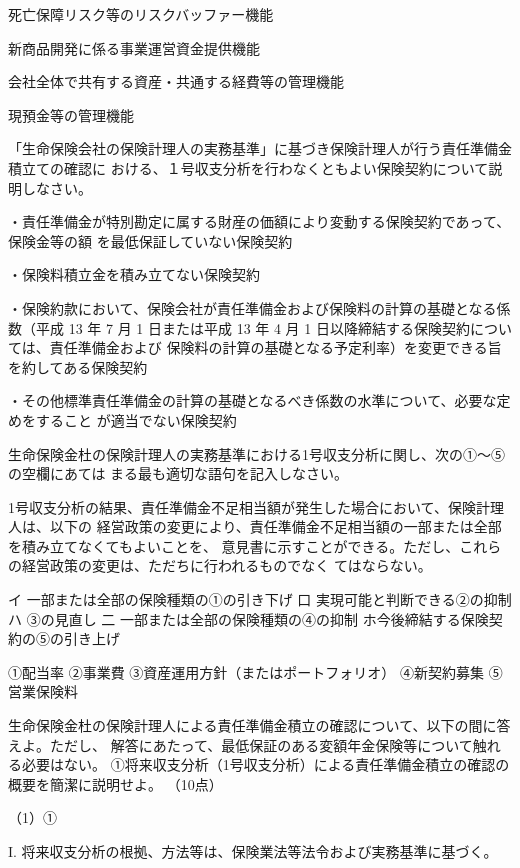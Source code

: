 \documentclass[report,gutter=10mm,fore-edge=10mm,uplatex,dvipdfmx]{jlreq}
\begin{document}
\answer{}
死亡保障リスク等のリスクバッファー機能

新商品開発に係る事業運営資金提供機能

会社全体で共有する資産・共通する経費等の管理機能

現預金等の管理機能

「生命保険会社の保険計理人の実務基準」に基づき保険計理人が行う責任準備金積立ての確認に
おける、１号収支分析を行わなくともよい保険契約について説明しなさい。

\answer{}

・責任準備金が特別勘定に属する財産の価額により変動する保険契約であって、保険金等の額
を最低保証していない保険契約

・保険料積立金を積み立てない保険契約

・保険約款において、保険会社が責任準備金および保険料の計算の基礎となる係数（平成 13
年 7 月 1 日または平成 13 年 4 月 1 日以降締結する保険契約については、責任準備金および
保険料の計算の基礎となる予定利率）を変更できる旨を約してある保険契約

・その他標準責任準備金の計算の基礎となるべき係数の水準について、必要な定めをすること
が適当でない保険契約

生命保険金杜の保険計理人の実務基準における1号収支分析に関し、次の①〜⑤の空欄にあては
まる最も適切な語句を記入しなさい。

1号収支分析の結果、責任準備金不足相当額が発生した場合において、保険計理人は、以下の
経営政策の変更により、責任準備金不足相当額の一部または全部を積み立てなくてもよいことを、
意見書に示すことができる。ただし、これらの経営政策の変更は、ただちに行われるものでなく
てはならない。

イ 一部または全部の保険種類の①の引き下げ
口 実現可能と判断できる②の抑制
ハ ③の見直し
二 一部または全部の保険種類の④の抑制
ホ今後締結する保険契約の⑤の引き上げ

\answer{}

①配当率
②事業費
③資産運用方針（またはポートフォリオ）
④新契約募集
⑤営業保険料

生命保険金杜の保険計理人による責任準備金積立の確認について、以下の間に答えよ。ただし、
解答にあたって、最低保証のある変額年金保険等について触れる必要はない。
①将来収支分析（1号収支分析）による責任準備金積立の確認の概要を簡潔に説明せよ。
（10点）

\answer{}
（1）①

I. 将来収支分析の根拠、方法等は、保険業法等法令および実務基準に基づく。
\end{document}
